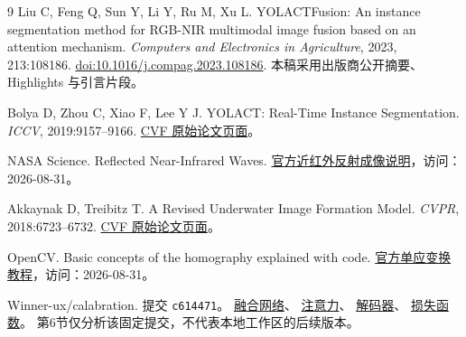 \documentclass[UTF8,a4paper,11pt,fontset=windows]{ctexart}
\newcommand{\coderef}[2]{\href{https://github.com/Winner-ux/calabration/blob/c61447127faea3625eec9a17ff841c7b249a8d59/#1}{#2}}
\begin{document}
\begin{thebibliography}{9}
\small
{}
Liu C, Feng Q, Sun Y, Li Y, Ru M, Xu L.
YOLACTFusion: An instance segmentation method for RGB-NIR multimodal image fusion based on an attention mechanism.
\emph{Computers and Electronics in Agriculture}, 2023, 213:108186.
\href{https://doi.org/10.1016/j.compag.2023.108186}{doi:10.1016/j.compag.2023.108186}.
本稿采用出版商公开摘要、Highlights 与引言片段。

Bolya D, Zhou C, Xiao F, Lee Y J.
YOLACT: Real-Time Instance Segmentation.
\emph{ICCV}, 2019:9157--9166.
\href{https://openaccess.thecvf.com/content_ICCV_2019/html/Bolya_YOLACT_Real-Time_Instance_Segmentation_ICCV_2019_paper.html}{CVF 原始论文页面}。

NASA Science. Reflected Near-Infrared Waves.
\href{https://science.nasa.gov/ems/08_nearinfraredwaves/}{官方近红外反射成像说明}，访问：2026-08-31。

Akkaynak D, Treibitz T. A Revised Underwater Image Formation Model.
\emph{CVPR}, 2018:6723--6732.
\href{https://openaccess.thecvf.com/content_cvpr_2018/html/Akkaynak_A_Revised_Underwater_CVPR_2018_paper.html}{CVF 原始论文页面}。

OpenCV. Basic concepts of the homography explained with code.
\href{https://docs.opencv.org/4.x/d9/dab/tutorial_homography.html}{官方单应变换教程}，访问：2026-08-31。

Winner-ux/calabration. 提交 \texttt{c614471}。
\coderef{model/fusion_net.py}{融合网络}、
\coderef{model/attention.py}{注意力}、
\coderef{model/decoder.py}{解码器}、
\coderef{main/loss.py}{损失函数}。
第6节仅分析该固定提交，不代表本地工作区的后续版本。
\end{thebibliography}
\end{document}
